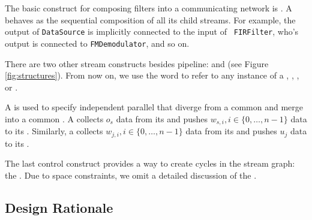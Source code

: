 
The basic construct for composing filters into a communicating
network is \pipeline.  A \pipeline behaves as the sequential
composition of all its child streams.  For example, the output of
{\tt DataSource} is implicitly connected to the input of {\tt
FIRFilter}, who's output is connected to {\tt FMDemodulator}, and
so on.

There are two other stream constructs besides pipeline: \splitjoin
and \feedbackloop (see Figure \ref{fig:structures}). From now on,
we use the word \stream to refer to any instance of a \filter,
\pipeline, \splitjoin, or \feedbackloop.

A \splitjoin is used to specify independent parallel \streams that
diverge from a common {\splitter} and merge into a common
{\joiner}. A \splitter collects $o_s$ data from its \Input
\Channel and pushes $w_{s,i}, i \in \{0,\dots,n-1\}$ data to its
\Output \Channels. Similarly, a \joiner collects $w_{j,i}, i \in
\{0,\dots,n-1\}$ data from its \Input \Channel and pushes $u_j$
data to its \Output \Channel.

\begin{comment}
There are two kinds of \splitters: 1) \duplicate, which replicates
each data item and sends a copy to each parallel \stream, and 2)
\roundrobin$(w_0, \dots, w_{n-1})$, which sends the first $w_0$
items to the first \stream, the next $w_1$ items to the second
\stream, and so on.  \roundrobin is also the only type of \joiner
that we support; its function is analogous to a \roundrobin
\splitter.  If a \roundrobin is written without any weights, we
assume that all $w_i = 1$. The \splitter and \joiner type are
specified with the keywords {\tt split} and {\tt join},
respectively (see Figure \ref{fig:radiocode}); the parallel
streams are specified by successive calls to {\tt add}, with the
$i$'th call setting the $i$'th stream in the splitjoin.
\end{comment}

The last control construct provides a way to create cycles in the
stream graph: the \feedbackloop.  Due to space constraints, we
omit a detailed discussion of the \feedbackloop.

\subsection{Design Rationale}

